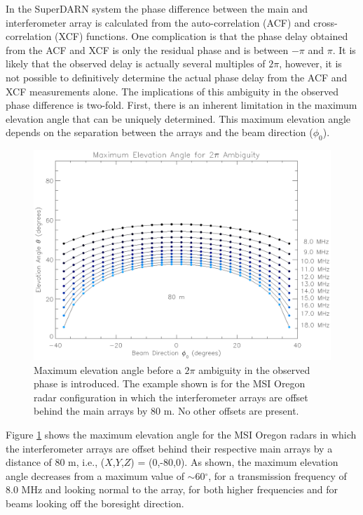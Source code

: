 \documentclass{article}
\begin{document}
\noindent
In the SuperDARN system the phase difference between the main and
interferometer array is calculated from the auto-correlation (ACF) and
cross-correlation (XCF) functions. One complication is that the phase delay
obtained from the ACF and XCF is only the residual phase and is between
$-\pi$ and $\pi$. It is likely that the observed delay is actually several
multiples of $2\pi$, however, it is not possible to definitively determine
the actual phase delay from the ACF and XCF measurements alone. The
implications of this ambiguity in the observed phase difference is two-fold.
First, there is an inherent limitation in the maximum elevation angle that
can be uniquely determined. This maximum elevation angle depends on the
separation between the arrays and the beam direction ($\phi_0$). \\

\begin{figure}[tb]
\includegraphics[scale=.9]{80m-2pi.ps}
\caption{Maximum elevation angle before a $2\pi$ ambiguity in the observed
phase is introduced. The example shown is for the MSI Oregon radar
configuration in which the interferometer arrays are offset behind the main
arrays by 80 m. No other offsets are present.}
\label{fig:2pi}
\end{figure}

\noindent
Figure \ref{fig:2pi} shows the maximum elevation angle for the MSI Oregon
radars in which the interferometer arrays are offset behind their respective
main arrays by a distance of 80 m, i.e., ($X$,$Y$,$Z$) = (0,-80,0). As shown,
the maximum elevation angle decreases from a maximum value of $\sim$60$^\circ$,
for a transmission frequency of 8.0 MHz and looking normal to the array, for
both higher frequencies and for beams looking off the boresight direction. \\
\end{document}
